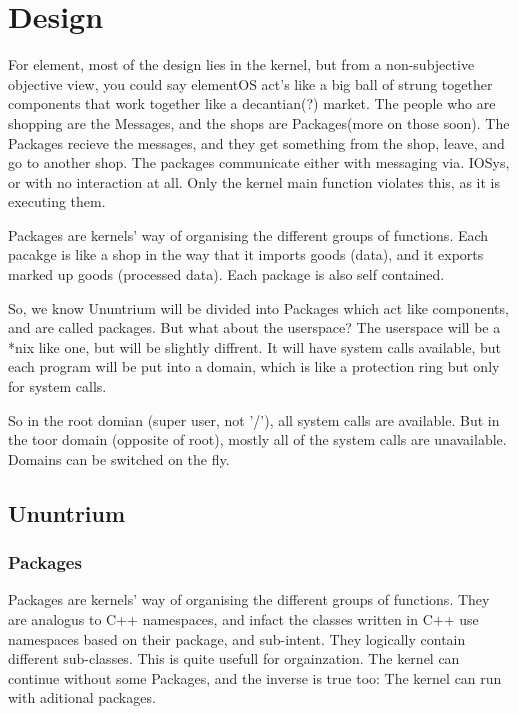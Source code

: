 \documentclass[12pt]{article}
\begin{document}
\section{Design}
For element, most of the design lies in the kernel, but from a non-subjective objective view, you could say elementOS act's like a big ball of strung together components that work together like a decantian(?) market. The people who are shopping are the Messages, and the shops are Packages(more on those soon). The Packages recieve the messages, and they get something from the shop, leave, and go to another shop. The packages communicate either with messaging via. IOSys, or with no interaction at all. Only the kernel main function violates this, as it is executing them.

Packages are kernels' way of organising the different groups of functions. Each pacakge is like a shop in the way that it imports goods (data), and it exports marked up goods (processed data). Each package is also self contained.

So, we know Ununtrium will be divided into Packages which act like components, and are called packages. But what about the userspace? The userspace will be a *nix like one, but will be slightly diffrent. It will have system calls available, but each program will be put into a domain, which is like a protection ring but only for system calls. 

So in the root domian (super user, not '/'), all system calls are available. But in the toor domain (opposite of root), mostly all of the system calls are unavailable. Domains can be switched on the fly.
\subsection{Ununtrium}

\subsubsection{Packages}
Packages are kernels' way of organising the different groups of functions. They are analogus to C++ namespaces, and infact the classes written in C++ use namespaces based on their package, and sub-intent. They logically contain different sub-classes. This is quite usefull for orgainzation. The kernel can continue without some Packages, and the inverse is true too: The kernel can run with aditional packages.
\end{document}
